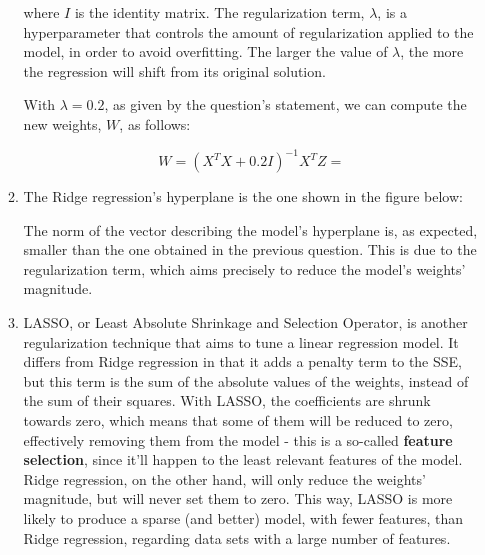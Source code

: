 \documentclass[12pt]{article}
\begin{document}
\begin{enumerate}[leftmargin=\labelsep]
\begin{enumerate}
{                where $I$ is the identity matrix. The regularization term, $\lambda$,
                is a hyperparameter that controls the amount of regularization applied
                to the model, in order to avoid overfitting. The larger the value of
                $\lambda$, the more the regression will shift from its original solution.

                With $\lambda=0.2$, as given by the question's statement, we can compute
                the new weights, $W$, as follows:

                \begin{equation*}
                  W = (X^T X + 0.2 I)^{-1} X^T Z = 
                \end{equation*}
                }
          \item {
                The Ridge regression's hyperplane is the one shown in the figure below:

                \begin{figure}[H]
                  \centering
                  
                \end{figure}

                The norm of the vector describing the model's hyperplane is, as expected,
                smaller than the one obtained in the previous question. This is due to
                the regularization term, which aims precisely to reduce the model's
                weights' magnitude.
                }
          \item {
                LASSO, or Least Absolute Shrinkage and Selection Operator, is another
                regularization technique that aims to tune a linear regression model.
                It differs from Ridge regression in that it adds a penalty term to the
                SSE, but this term is the sum of the absolute values of the weights,
                instead of the sum of their squares.
                With LASSO, the coefficients are shrunk towards zero, which means that
                some of them will be reduced to zero, effectively removing them from the
                model - this is a so-called \textbf{feature selection}, since it'll
                happen to the least relevant features of the model. Ridge regression,
                on the other hand, will only reduce the weights' magnitude, but will
                never set them to zero. This way, LASSO is more likely to produce a
                sparse (and better) model, with fewer features, than Ridge regression,
                regarding data sets with a large number of features.
                }
        \end{enumerate}


\end{enumerate}
\end{document}
